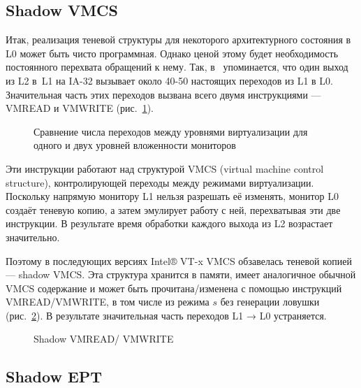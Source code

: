 \subsection{Shadow VMCS}
Итак, реализация теневой структуры для некоторого архитектурного состояния в L0 может быть чисто программная. Однако ценой этому будет необходимость постоянного перехвата обращений к нему. Так, в \cite{nested-virt-kvm-2013} упоминается, что один выход из L2 в L1 на IA-32 вызывает около 40-50 настоящих переходов из L1 в L0. Значительная часть этих переходов вызвана всего двумя инструкциями — VMREAD и VMWRITE (рис. \ref{fig:nested-vmread}).

\begin{figure}[htb]
    \centering
    \caption[Сравнение числа переходов между уровнями виртуализации]{Сравнение числа переходов между уровнями виртуализации для одного и двух уровней вложенности мониторов}
    \label{fig:nested-vmread}
\end{figure}

Эти инструкции работают над структурой VMCS (\abbr virtual machine control structure), контролирующей переходы между режимами виртуализации. Поскольку напрямую монитору L1 нельзя разрешать её изменять, монитор L0 создаёт теневую копию, а затем эмулирует работу с ней, перехватывая эти две инструкции. В результате время обработки каждого выхода из L2 возрастает значительно.

Поэтому в последующих версиях Intel® VT-x VMCS обзавелась теневой копией — shadow VMCS. Эта структура хранится в памяти, имеет аналогичное обычной VMCS содержание и может быть прочитана/изменена с помощью инструкций VMREAD/VMWRITE, в том числе из режима $s$ без генерации ловушки (рис. \ref{fig:nested-vmread-shadow}).
В результате значительная часть переходов L1 → L0 устраняется. %


\begin{figure}[htb]
    \centering
    \caption[]{Shadow VMREAD/ VMWRITE \todo}
    \label{fig:nested-vmread-shadow}
\end{figure}


\subsection{Shadow EPT}

